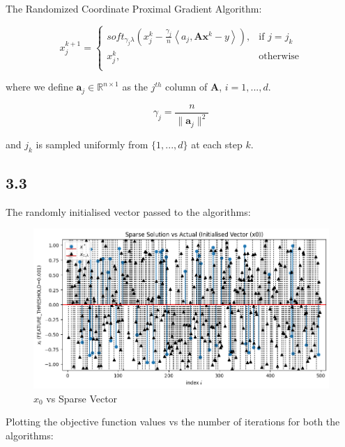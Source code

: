 \documentclass[12pt]{article}
\begin{document}
The Randomized Coordinate Proximal Gradient Algorithm:

\[x_j^{k+1} = \begin{cases}
      soft_{\gamma_j \lambda}(x_j^k - \frac{\gamma_j}{n} \left\langle a_j, \textbf{A} \textbf{x}^k - y\right\rangle), & \text{if } j = j_k \\
      x_j^k, & \text{otherwise} \\
   \end{cases}
\]

where we define $\textbf{a}_j \in \mathbb{R}^{n \times 1}$ as the $j^{th}$ column of $\textbf{A}$, $i=1, ..., d$.

\[\gamma_j = \frac{n}{\|\textbf{a}_j\|^2}\]

and $j_k$ is sampled uniformly from $\{1, ..., d\}$ at each step $k$.

\newpage
\subsection*{3.3}

The randomly initialised vector passed to the algorithms:

\begin{figure}[h]
\centering
\includegraphics[scale=0.35]{outputs/part_3/initial-x}
\caption{$x_0$ vs Sparse Vector}
\label{fig:}
\end{figure}

Plotting the objective function values vs the number of iterations for both the algorithms:
\end{document}
